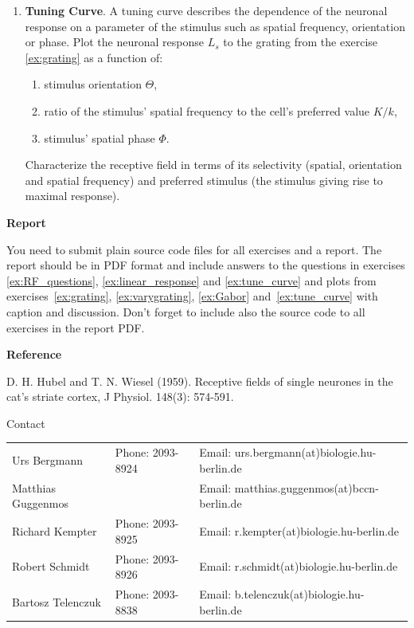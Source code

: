 \documentclass[12pt, a4]{article}
\begin{document}
\begin{enumerate}
    \item\label{ex:tune_curve} \textbf{Tuning Curve}. A tuning curve describes the dependence of
        the neuronal response on a parameter of the stimulus such as
        spatial frequency, orientation or phase. Plot the neuronal
        response $L_s$ to the grating from the exercise \ref{ex:grating} as a 
        function of:

        \begin{enumerate}
            \item\label{ex:tuneorient} stimulus orientation $\Theta$,
            \item ratio of the stimulus' spatial frequency to the
                cell's preferred value $K/k$,
            \item\label{ex:tunephase} stimulus' spatial phase  $\Phi$.

        \end{enumerate}
        Characterize the receptive field in terms of its selectivity
        (spatial, orientation and spatial frequency) and preferred stimulus
        (the stimulus giving rise to maximal response). 

\end{enumerate}

{\bf Report}

You need to submit plain source code files for all exercises and a
report. The report should be in PDF format and include answers to the
questions in exercises \ref{ex:RF_questions}, \ref{ex:linear_response}
and \ref{ex:tune_curve} and plots from exercises~\ref{ex:grating},
\ref{ex:varygrating}, \ref{ex:Gabor} and~\ref{ex:tune_curve} with
caption and discussion.  Don't forget to include also the source code
to all exercises in the report PDF.

\vspace{1cm}
{\bf Reference}

D. H. Hubel and T. N. Wiesel (1959). Receptive fields of single
neurones in the cat's striate cortex, J Physiol. 148(3): 574-591. 

\vfill
\centerline{\CAP Contact}
\CAP

\begin{tabular}{lll}
Urs Bergmann & Phone: 2093-8924 & Email:
urs.bergmann(at)biologie.hu-berlin.de \\
Matthias Guggenmos & & Email: matthias.guggenmos(at)bccn-berlin.de \\
Richard Kempter \hfill & Phone: 2093-8925 \hfill & Email:
r.kempter(at)biologie.hu-berlin.de \\
Robert Schmidt & Phone: 2093-8926 & Email: r.schmidt(at)biologie.hu-berlin.de
\\
Bartosz Telenczuk & Phone: 2093-8838 & Email:
b.telenczuk(at)biologie.hu-berlin.de \\
\end{tabular}
\end{document}
